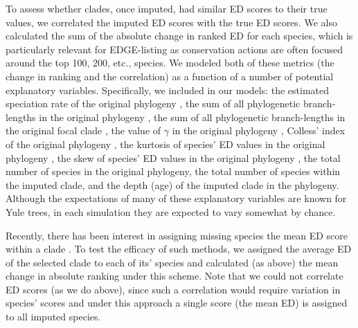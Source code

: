 \documentclass[10pt,english]{article}
\begin{document}
To assess whether clades, once imputed, had similar ED scores to their true
values, we correlated the imputed ED scores with the true ED scores. We also
calculated the sum of the absolute change in ranked ED for each species, which
is particularly relevant for EDGE-listing as conservation actions are often
focused around the top 100, 200, etc., species. We modeled both of these metrics
(the change in ranking and the correlation) as a function of a number of
potential explanatory variables. Specifically, we included in our models: the
estimated speciation rate of the original phylogeny \autocite[using
\texttt{ape::yule};][]{Paradis2004}, the sum of all phylogenetic branch-lengths
in the original phylogeny \autocite[Faith's PD;][]{Faith1992}, the sum of all
phylogenetic branch-lengths in the original focal clade \autocite[Faith's
PD;][]{Faith1992}, the value of $\gamma$ in the original phylogeny
\autocite[using \texttt{phytools::gammatest};][]{Pybus2000, Revell2012},
Colless' index of the original phylogeny
\autocite[using \texttt{apTreeshape::as.treeshape};][]{Colless1982,
Bortolussi2009}, the kurtosis of species' ED values in the original phylogeny
\autocite[using \texttt{moments::kurtosis};][]{Komsta2015}, the skew of species'
ED values in the original phylogeny \autocite[using
\texttt{moments::skew};][]{Komsta2015}, the total number of species in the
original phylogeny, the total number of species within the imputed clade, and
the depth (age) of the imputed clade in the phylogeny. Although the expectations
of many of these explanatory variables are known for Yule trees, in each
simulation they are expected to vary somewhat by chance.

Recently, there has been interest in assigning missing species the mean ED score
within a clade \autocite[see][]{Gumbs2018}. To test the efficacy of such
methods, we assigned the average ED of the selected clade to each of its'
species and calculated (as above) the mean change in absolute ranking under this
scheme. Note that we could not correlate ED scores (as we do above), since such
a correlation would require variation in species' scores and under this approach
a single score (the mean ED) is assigned to all imputed species.
\end{document}
